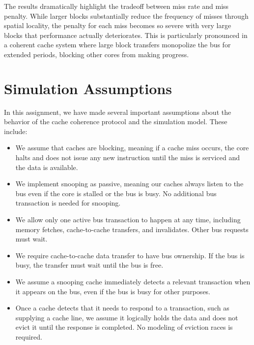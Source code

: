 \documentclass[11pt,a4paper]{article}
\begin{document}
\begin{itemize}[leftmargin=*]
    The results dramatically highlight the tradeoff between miss rate and miss penalty. While larger blocks substantially reduce the frequency of misses through spatial locality, the penalty for each miss becomes so severe with very large blocks that performance actually deteriorates. This is particularly pronounced in a coherent cache system where large block transfers monopolize the bus for extended periods, blocking other cores from making progress.

    \section{Simulation Assumptions}

    In this assignment, we have made several important assumptions about the behavior of the cache coherence protocol and the simulation model. These include:

    \begin{itemize}[leftmargin=*]
        \item We assume that caches are blocking, meaning if a cache miss occurs, the core halts and
        does not issue any new instruction until the miss is serviced and the data
        is available.
        
        \item We implement snooping as passive, meaning our caches always listen to the bus even if the core is stalled or the bus is busy. No additional bus transaction is needed
        for snooping.
        
        \item We allow only one active bus transaction to happen at any time, including memory
        fetches, cache-to-cache transfers, and invalidates. Other bus requests must
        wait.
        
        \item We require cache-to-cache data transfer to have bus ownership. If the bus is busy,
        the transfer must wait until the bus is free.
        
        \item We assume a snooping cache immediately detects a relevant transaction when it appears
        on the bus, even if the bus is busy for other purposes.
        
        \item Once a cache detects that it needs to respond to a transaction, such as
        supplying a cache line, we assume it logically holds the data and does not evict it
        until the response is completed. No modeling of eviction races is required.
        

\end{itemize}
\end{itemize}
\end{document}
